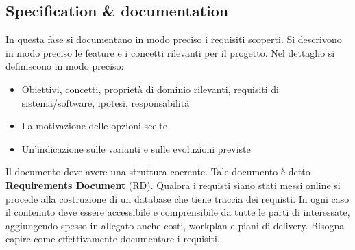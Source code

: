 \subsection{Specification \& documentation}
In questa fase si documentano in modo preciso i requisiti scoperti. Si descrivono
in modo preciso le feature e i concetti rilevanti per il progetto. Nel dettaglio
si definiscono in modo preciso:
\begin{itemize}
      \item Obiettivi, concetti, proprietà di dominio rilevanti, requisiti di
            sistema/software, ipotesi, responsabilità
      \item La motivazione delle opzioni scelte
      \item Un'indicazione sulle varianti e sulle evoluzioni previste
\end{itemize}
Il documento deve avere una struttura coerente. Tale documento è detto
\textbf{Requirements Document} (RD). Qualora i requisti siano stati messi online
si procede alla costruzione di un database che tiene traccia dei requisti. In
ogni caso il contenuto deve essere accessibile e comprensibile da tutte le parti
di interessate, aggiungendo spesso in allegato anche costi, workplan e piani di
delivery. Bisogna capire come effettivamente documentare i requisiti.
